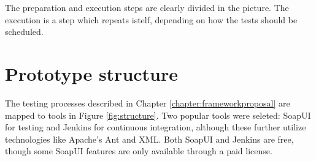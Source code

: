 \documentclass[12pt,a4paper,oneside,pdftex]{report}
\begin{document}
{\begin{comment}
\node [proc] (cap) {Capturing messages};
\node [proc] (gen) {Integration test case/surrogate generation};
\node [proc] (upd) {Updating test package/resources};
\node [syst] (db) {Test data base};
\node [proc] (exe) {Test case execution};
\node [sut] (sut) {System under test};
\node [file, right=of cap] (rec) {Mes-sage record};
\node [file, rihgt=of gen] (cse) {Case/ surrogate};
\node [proc, right=of upd] (ver) {Verification};
\node [file, right=of db] (trc) {Exe-cution trace};
\node [proc, right=of exe] (col) {Trace collecting};

\path [line] (cap) -- (rec);
\path [line] (rec) -- (gen);
\path [line] (gen) -- (cse);
\path [line] (ver) -- (upd); 
\path [line] (cse) -- (2.5,-3) -- (2.5,-8) -- (exe);
\path [dots] (upd) -- (db);
\path [line] (exe) -- (sut);
\path [line] (exe) -- (db);
\path [line] (exe) -- (col);
\path [line] (col) -- (sut);
\path [line] (col) -- (trc);
\path [line] (trc) -- (ver);

\end{tikzpicture}
\caption{Testing framework hypothesis, adapted from \citet{liu2009unified}} \label{fig:UTF}
\end{figure}
\end{comment}

The preparation and execution steps are clearly divided in the picture. The execution is a step which repeats istelf, depending on how the tests should be scheduled.



\section{Prototype structure}


The testing processes described in Chapter \ref{chapter:frameworkproposal} are mapped to tools in Figure \ref{fig:structure}. Two popular tools were seleted: SoapUI for testing and Jenkins for continuous integration, although these further utilize technologies like Apache's Ant and XML. Both SoapUI and Jenkins are free, though some SoapUI features are only available through a paid license.

}
\end{document}
